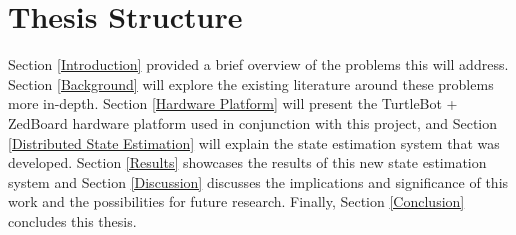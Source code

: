 \documentclass[thesis.tex]{subfile}
\begin{document}
\section{Thesis Structure} \label{Thesis Structure}
Section \ref{Introduction} provided a brief overview of the problems this will address. Section \ref{Background} will explore the existing literature around these problems more in-depth. Section \ref{Hardware Platform} will present the TurtleBot + ZedBoard hardware platform used in conjunction with this project, and Section \ref{Distributed State Estimation} will explain the state estimation system that was developed. Section \ref{Results} showcases the results of this new state estimation system and Section \ref{Discussion} discusses the implications and significance of this work and the possibilities for future research. Finally, Section \ref{Conclusion} concludes this thesis.
\end{document}
